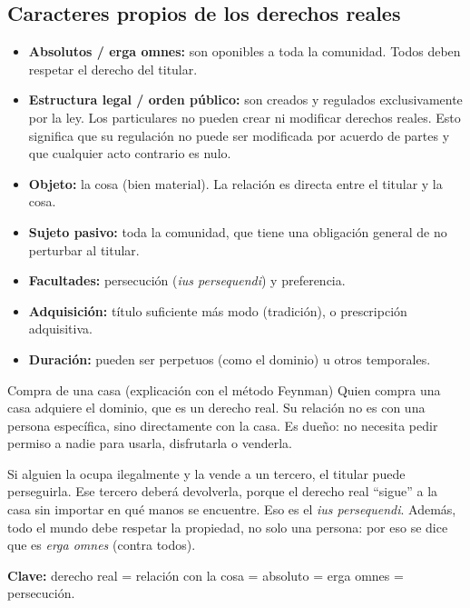 \documentclass[12pt,oneside]{book}
\begin{document}
\subsection{Caracteres propios de los derechos reales}

\begin{itemize}
    \item \textbf{Absolutos / erga omnes:} son oponibles a toda la comunidad. Todos deben respetar el derecho del titular.
    \item \textbf{Estructura legal / orden p\'ublico:} son creados y regulados exclusivamente por la ley. Los particulares no pueden crear ni modificar derechos reales. Esto significa que su regulaci\'on no puede ser modificada por acuerdo de partes y que cualquier acto contrario es nulo.
    \item \textbf{Objeto:} la cosa (bien material). La relaci\'on es directa entre el titular y la cosa.
    \item \textbf{Sujeto pasivo:} toda la comunidad, que tiene una obligaci\'on general de no perturbar al titular.
    \item \textbf{Facultades:} persecuci\'on (\textit{ius persequendi}) y preferencia.
    \item \textbf{Adquisici\'on:} t\'itulo suficiente m\'as modo (tradici\'on), o prescripci\'on adquisitiva.
    \item \textbf{Duraci\'on:} pueden ser perpetuos (como el dominio) u otros temporales.
\end{itemize}

\begin{example}{Compra de una casa (explicaci\'on con el m\'etodo Feynman)}
Quien compra una casa adquiere el dominio, que es un derecho real. Su relaci\'on no es con una persona espec\'ifica, sino directamente con la casa. Es due\~no: no necesita pedir permiso a nadie para usarla, disfrutarla o venderla.

Si alguien la ocupa ilegalmente y la vende a un tercero, el titular puede perseguirla. Ese tercero deber\'a devolverla, porque el derecho real ``sigue'' a la casa sin importar en qu\'e manos se encuentre. Eso es el \textit{ius persequendi}. Adem\'as, todo el mundo debe respetar la propiedad, no solo una persona: por eso se dice que es \textit{erga omnes} (contra todos).

\textbf{Clave:} derecho real = relaci\'on con la cosa = absoluto = erga omnes = persecuci\'on.
\end{example}
\end{document}
